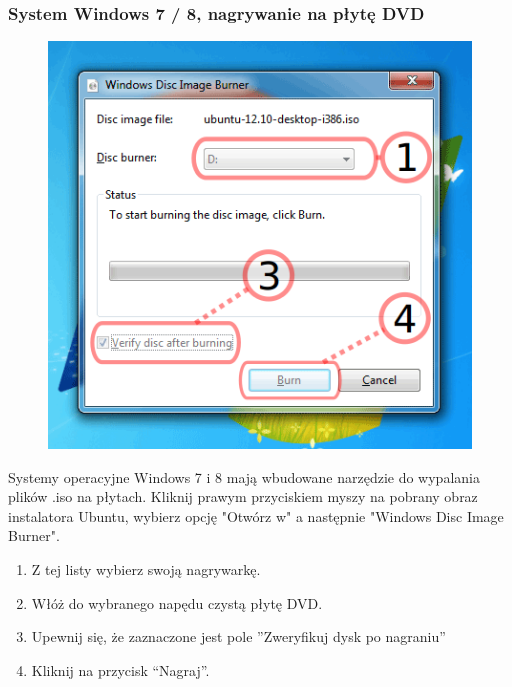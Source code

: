 \subsubsection{System Windows 7 / 8, nagrywanie na płytę DVD}
\begin{figure}
                \includegraphics[width=\linewidth]{images/instalacja_nagrywanie_obrazu_DVD.png}
\end{figure}
Systemy operacyjne Windows 7 i 8 mają wbudowane narzędzie do wypalania plików .iso na płytach. Kliknij prawym przyciskiem myszy na pobrany obraz instalatora Ubuntu, wybierz opcję "Otwórz w" a następnie "Windows Disc Image Burner".
\begin{enumerate}
\item Z tej listy wybierz swoją nagrywarkę.
\item Włóż do wybranego napędu czystą płytę DVD.
\item Upewnij się, że zaznaczone jest pole ”Zweryfikuj dysk po nagraniu”
\item Kliknij na przycisk “Nagraj”.
\end{enumerate}
\clearpage
